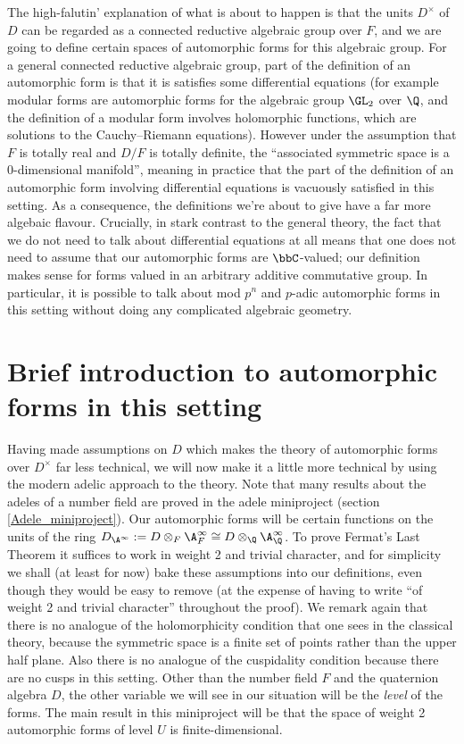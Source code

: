 The high-falutin' explanation of what is about to happen is that the units $D^\times$ of $D$
can be regarded as a connected reductive algebraic group over $F$, and we are going to define certain spaces
of automorphic forms for this algebraic group. For a general connected reductive algebraic group,
part of the definition of an automorphic form is that it is satisfies some differential
equations (for example modular forms are automorphic forms for the algebraic group $\GL_2$ over
$\Q$, and the definition of a modular form involves holomorphic functions, which are solutions to
the Cauchy--Riemann equations). However under the assumption that $F$ is totally real and $D/F$ is
totally definite, the ``associated symmetric space is a 0-dimensional manifold'', meaning in practice that
the part of the definition of an automorphic form involving differential equations is vacuously satisfied in this setting.
As a consequence, the definitions we're about to give have a far more algebaic flavour. Crucially, in stark
contrast to the general theory, the fact that we do not need to talk about differential equations at all means that one does
not need to assume that our automorphic forms are $\bbC$-valued; our definition makes sense for forms valued in an arbitrary additive commutative group.
In particular, it is possible to talk about mod $p^n$ and $p$-adic automorphic forms in this setting without doing any complicated algebraic geometry.

\section{Brief introduction to automorphic forms in this setting}

Having made assumptions on $D$ which makes the theory of automorphic forms over $D^\times$
far less technical, we will now make it a little more technical by using the modern adelic
approach to the theory. Note that many results about the adeles of a number field are proved
in the adele miniproject (section \ref{Adele_miniproject}). Our automorphic forms will be certain
functions on the units of the ring $D_{\A^\infty}:=D\otimes_F\A_F^\infty\cong D\otimes_{\Q}\A_{\Q}^\infty$.
To prove Fermat's Last Theorem it suffices to work in weight 2 and trivial character, and for simplicity we shall (at least for now)
bake these assumptions into our definitions, even though they would be easy to remove (at the expense of having
to write ``of weight 2 and trivial character'' throughout the proof). We remark again that
there is no analogue of the holomorphicity condition that one sees in the classical theory,
because the symmetric space is a finite set of points rather than the upper half plane. Also
there is no analogue of the cuspidality condition because there are no cusps in this setting.
Other than the number field $F$ and the quaternion algebra $D$, the other variable we will see in our situation
will be the \emph{level} of the forms. The main result in this miniproject will be that the space of weight 2 automorphic forms of level $U$
is finite-dimensional.

